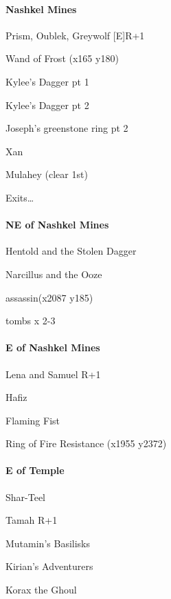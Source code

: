 \documentclass[10pt,a4,twoside]{book}
\begin{document}
\begin{multicols}{3}
\paragraph*{Nashkel Mines}  \label{mines} %
\begin{trivlist}
\item Prism, Oublek, Greywolf [E]{\textcolor{OliveGreen}{R+1}}  \label{prism} %
\item Wand of Frost (x165 y180)
\item Kylee's Dagger pt 1
\item Kylee's Dagger pt 2
\item Joseph's greenstone ring pt 2   \label{gring} %
\item Xan
\item Mulahey (clear 1st)
\item Exits\ldots
\end{trivlist}

\paragraph*{NE of Nashkel Mines}
\begin{trivlist}
\item Hentold and the Stolen Dagger
\item Narcillus and the Ooze
\item assassin(x2087 y185)
\item tombs x 2-3
\end{trivlist}

\paragraph*{E of Nashkel Mines}
\begin{trivlist}
\item Lena and Samuel {\textcolor{OliveGreen}{R+1}}   \label{samuel} %
\item Hafiz
\item Flaming Fist
\item Ring of Fire Resistance (x1955 y2372)
\end{trivlist}

\paragraph*{E of Temple}
\begin{trivlist}
\item Shar-Teel
\item Tamah {\textcolor{OliveGreen}{R+1}}
\item Mutamin's Basilisks
\item Kirian's Adventurers
\item Korax the Ghoul
\end{trivlist}


\end{multicols}
\end{document}
